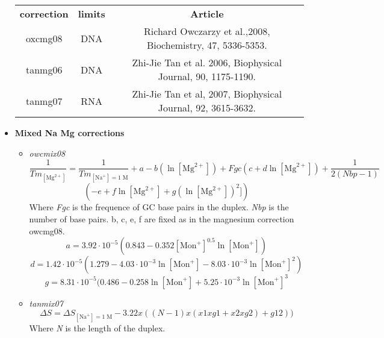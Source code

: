 \documentclass{article}
\begin{document}
\begin{itemize}
 \begin{table}[h]
\begin{tabular}[h]{| c | c | c |}
\textbf{correction} & \textbf{limits} & \textbf{Article} \\ 
oxcmg08 & DNA & Richard Owczarzy et al.,2008, Biochemistry, 47, 5336-5353. \\
tanmg06 & DNA & Zhi-Jie Tan et al. 2006, Biophysical Journal, 90, 1175-1190. \\
tanmg07 & RNA & Zhi-Jie Tan et al, 2007, Biophysical Journal, 92, 3615-3632. \\
\end{tabular}
\end{table}

\item \textbf{Mixed Na Mg corrections} 
 \begin{itemize}
 \item \textit{owcmix08}
 \begin{displaymath}
 \frac{1}{Tm_{[\mbox{Mg}^{2+}]}} = \frac{1}{Tm_{[\mbox{Na}^+]=1\;\mathrm{M}}} + a
 - b (\ln [\mbox{Mg}^{2+}]) + Fgc (c + d \ln [\mbox{Mg}^{2+}]) + \frac{1}{2 (Nbp-1)} 
 \end{displaymath}
 \begin{displaymath}
 (-e + f \ln [\mbox{Mg}^{2+}] + g (\ln [\mbox{Mg}^{2+}])^{2}])
 \end{displaymath}
 Where \emph{Fgc} is the frequence of GC base pairs in the duplex.
 \emph{Nbp} is the number of base pairs.
 b, c, e, f are fixed as in the magnesium correction owcmg08.
 \begin{displaymath}
 a = 3.92\cdot{}10^{-5} (0.843 - 0.352 [\mbox{Mon}^+]^{0.5} \ln [\mbox{Mon}^+]) 
 \end{displaymath}
 \begin{displaymath}
 d = 1.42\cdot{}10^{-5} (1.279 - 4.03\cdot{}10^{-3} \ln [\mbox{Mon}^+] -
 8.03\cdot{}10^{-3} \ln [\mbox{Mon}^+]^{2})
 \end{displaymath}
 \begin{displaymath}
 g = 8.31\cdot{}10^{-5} (0.486 - 0.258 \ln [\mbox{Mon}^+] + 5.25\cdot{}10^{-3}
 \ln [\mbox{Mon}^+]^{3} 
 \end{displaymath}
 \item \textit{tanmix07}
 \begin{displaymath}
 \Delta{}S=\Delta{}S_{[\mbox{Na}^+]=1\;\mathrm{M}}- 3.22 x ((N - 1) x (x1 x g1 + x2 x g2) + g12))  
 \end{displaymath}
 Where \emph{N} is the length of the duplex.
 \begin{displaymath}

\end{displaymath}
\end{itemize}
\end{itemize}
\end{document}

